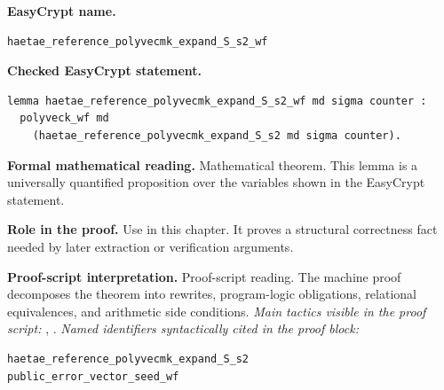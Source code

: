 \begin{formaltheorem}
\noindent\textbf{EasyCrypt name.}
\begin{lstlisting}[language=EasyCrypt,basicstyle=\ttfamily\scriptsize]
haetae_reference_polyvecmk_expand_S_s2_wf
\end{lstlisting}
\noindent\textbf{Checked EasyCrypt statement.}
\begin{lstlisting}[language=EasyCrypt,basicstyle=\ttfamily\scriptsize]
lemma haetae_reference_polyvecmk_expand_S_s2_wf md sigma counter :
  polyveck_wf md
    (haetae_reference_polyvecmk_expand_S_s2 md sigma counter).
\end{lstlisting}
\noindent\textbf{Formal mathematical reading.}
Mathematical theorem. This lemma is a universally quantified proposition over the variables shown in the EasyCrypt statement.

\noindent\textbf{Role in the proof.}
Use in this chapter. It proves a structural correctness fact needed by later extraction or verification arguments.

\noindent\textbf{Proof-script interpretation.}
Proof-script reading. The machine proof decomposes the theorem into rewrites, program-logic obligations, relational equivalences, and arithmetic side conditions.
\emph{Main tactics visible in the proof script:} , .
\emph{Named identifiers syntactically cited in the proof block:}
\begin{lstlisting}[language=EasyCrypt,basicstyle=\ttfamily\scriptsize]
haetae_reference_polyvecmk_expand_S_s2
public_error_vector_seed_wf
\end{lstlisting}

\end{formaltheorem}

